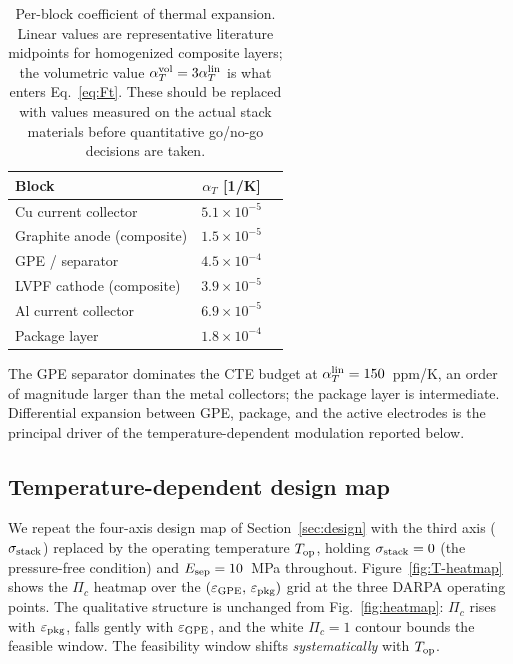 \documentclass[11pt,letterpaper]{article}
\begin{document}
\begin{table}[H]
\centering
\caption{Per-block coefficient of thermal expansion.  Linear values
are representative literature midpoints for homogenized composite
layers; the volumetric value $\alpha_T^{\rm vol} = 3\alpha_T^{\rm
lin}$ is what enters Eq.~\eqref{eq:Ft}.  These should be replaced
with values measured on the actual stack materials before
quantitative go/no-go decisions are taken.}
\label{tab:CTE}
\begin{tabular}{lcc}
\toprule
Block  & $\alpha_T$ [1/K] \\
\midrule
Cu current collector       & $5.1\times 10^{-5}$ \\
Graphite anode (composite)  & $1.5\times 10^{-5}$ \\
GPE / separator            & $4.5\times 10^{-4}$ \\
LVPF cathode (composite)   & $3.9\times 10^{-5}$ \\
Al current collector        & $6.9\times 10^{-5}$ \\
Package layer              & $1.8\times 10^{-4}$ \\
\bottomrule
\end{tabular}
\end{table}

The GPE separator dominates the CTE budget at $\alpha_T^{\rm lin} =
150$~ppm/K, an order of magnitude larger than the metal collectors;
the package layer is intermediate.  Differential expansion between
GPE, package, and the active electrodes is the principal driver of
the temperature-dependent modulation reported below.

\subsection{Temperature-dependent design map}

We repeat the four-axis design map of Section~\ref{sec:design} with
the third axis ($\sigma_{\rm stack}$) replaced by the operating
temperature $T_{\rm op}$, holding $\sigma_{\rm stack} = 0$ (the
pressure-free condition) and $E_{\rm sep} = 10$~MPa throughout.
Figure~\ref{fig:T-heatmap} shows the $\Pi_c$ heatmap over the
$(\varepsilon_{\rm GPE},\,\varepsilon_{\rm pkg})$ grid at the three
DARPA operating points.  The qualitative structure is unchanged from
Fig.~\ref{fig:heatmap}: $\Pi_c$ rises with $\varepsilon_{\rm pkg}$,
falls gently with $\varepsilon_{\rm GPE}$, and the white $\Pi_c = 1$
contour bounds the feasible window.  The feasibility window shifts
\emph{systematically} with $T_{\rm op}$.
\end{document}
